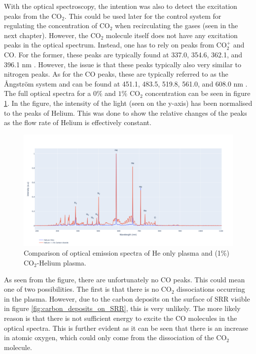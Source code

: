 With the optical spectroscopy, the intention was also to detect the excitation peaks from the CO$_2$. This could be used later for the control system for regulating the concentration of CO$_2$ when recirculating the gases (seen in the next chapter). However, the CO$_2$ molecule itself does not have any excitation peaks in the optical spectrum. Instead, one has to rely on peaks from CO$_2^+$ and CO. For the former, these peaks are typically found at 337.0, 354.6, 362.1, and 396.1 nm \cite{Pearse1976}. However, the issue is that these peaks typically also very similar to nitrogen peaks. As for the CO peaks, these are typically referred to as the Ångström system and can be found at 451.1, 483.5, 519.8, 561.0, and 608.0 nm \cite{Pearse1976}. The full optical spectra for a $0\%$  and $1\%$ CO$_2$ concentration can be seen in figure \ref{fig:he_co2_optical_spectra}. In the figure, the intensity of the light (seen on the y-axis) has been normalised to the peaks of Helium. This was done to show the relative changes of the peaks as the flow rate of Helium is effectively constant.

\begin{figure}[h!]
	\centering
	\includegraphics[width=\linewidth]{chapter_4/figures/he_co2_optical_spectra.png}
	\caption{Comparison of optical emission spectra of He only plasma and (1\%) CO$_2$-Helium plasma.}
	\label{fig:he_co2_optical_spectra}
\end{figure}

As seen from the figure, there are unfortunately no CO peaks. This could mean one of two possibilities. The first is that there is no CO$_2$ dissociations occurring in the plasma. However, due to the carbon deposits on the surface of SRR visible in figure \ref{fig:carbon_deposits_on_SRR}, this is very unlikely. The more likely reason is that there is not sufficient energy to excite the CO molecules in the optical spectra. This is further evident as it can be seen that there is an increase in atomic oxygen, which could only come from the dissociation of the CO$_2$ molecule. 

